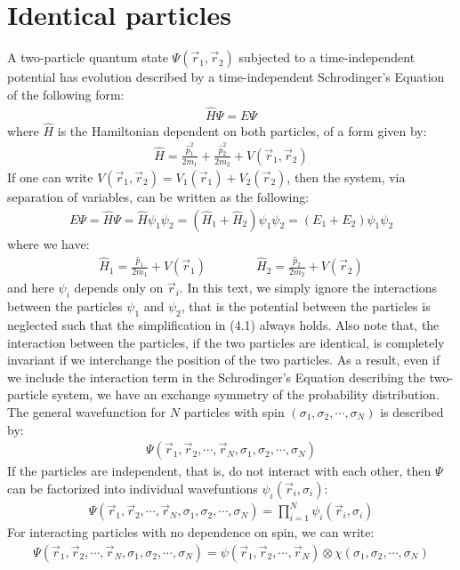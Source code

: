 \documentclass[11pt]{book}
\theoremstyle{break}
\theoremstyle{break}
\begin{document}
\section[Identical Particles]{\color{red}Identical particles\color{black}}
A two-particle quantum state $\Psi(\vec{r}_1,\vec{r}_2)$ subjected to a time-independent potential has evolution described by a time-independent Schrodinger's Equation of the following form:
\begin{align*}
\hat{H} \Psi = E\Psi
\end{align*}
where $\hat{H}$ is the Hamiltonian dependent on both particles, of a form given by:
\begin{align*}
\hat{H} = \frac{\hat{p}_1^2}{2m_1} + \frac{\hat{p}_2^2}{2m_2} + V(\vec{r}_1,\vec{r}_2)
\end{align*}
If one can write $V(\vec{r}_1,\vec{r}_2) = V_1(\vec{r}_1)+V_2(\vec{r}_2)$, then the system, via separation of variables, can be written as the following:
\begin{align}
E\Psi = \hat{H}\Psi = \hat{H}\psi_1 \psi_2 = (\hat{H}_1 + \hat{H}_2) \psi_1 \psi_2   = (E_1+E_2)\psi_1 \psi_2 
\end{align}
where we have:
\begin{align*}
\hat{H}_1 = \frac{\hat{p}_1}{2m_1} + V(\vec{r}_1) \qquad\qquad
\hat{H}_2 = \frac{\hat{p}_2}{2m_2} + V(\vec{r}_2)
\end{align*}
and here $\psi_i$ depends only on $\vec{r}_i$. In this text, we simply ignore the interactions between the particles $\psi_1$ and $\psi_2$, that is the potential between the particles is neglected such that the simplification in (4.1) always holds. Also note that, the interaction between the particles, if the two particles are identical, is completely invariant if we interchange the position of the two particles. As a result, even if we include the interaction term in the Schrodinger's Equation describing the two-particle system, we have an exchange symmetry of the probability distribution. \\

The general wavefunction for $N$ particles with spin $(\sigma_1,\sigma_2,\cdots, \sigma_N)$ is described by:
\begin{align*}
\Psi\left(\vec{r}_1, \vec{r}_2,\cdots, \vec{r}_N, \sigma_1,\sigma_2,\cdots, \sigma_N\right)
\end{align*}
If the particles are independent, that is, do not interact with each other, then $\Psi$ can be factorized into individual wavefuntions $\psi_i(\vec{r}_i, \sigma_i)$:
\begin{align*}
\Psi \left(\vec{r}_1, \vec{r}_2,\cdots, \vec{r}_N, \sigma_1,\sigma_2,\cdots, \sigma_N\right) = \prod_{i=1}^N\psi_i(\vec{r}_i, \sigma_i)
\end{align*}
For interacting particles with no dependence on spin, we can write:
\begin{align*}
\Psi\left(\vec{r}_1, \vec{r}_2,\cdots, \vec{r}_N, \sigma_1,\sigma_2,\cdots, \sigma_N\right) = \psi(\vec{r}_1,\vec{r}_2,\cdots, \vec{r}_N)\otimes \chi(\sigma_1,\sigma_2,\cdots, \sigma_N)
\end{align*}
\end{document}

